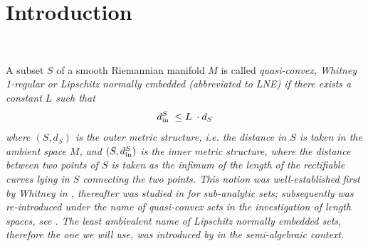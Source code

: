 \documentclass[11pt]{amsart}
\newcommand{\inn}{{{\rm in}}}
\numberwithin{equation}{section}
\numberwithin{equation}{section}
\begin{document}
\maketitle
\setcounter{tocdepth}{1}
\tableofcontents



\section{Introduction}
%
%
$ $

A subset $S$ of a smooth Riemannian manifold $M$ is called \em quasi-convex, Whitney 1-regular 
\em or \em Lipschitz normally embedded \em (abbreviated to LNE) if there exists a constant $L$ such that
\begin{equation}\label{eq:prop-LNE}
d_\inn^S \; \leq L \; \cdot d_S
\end{equation}
where $(S,d_S)$ is the outer metric structure, i.e. the distance in $S$
is taken in the ambient space $M$, and $(S,d_\inn^S)$ is the inner metric structure, where the
distance between two points of $S$ is taken as the infimum of the length of the 
rectifiable curves lying in $S$ connecting the two points. This notion was well-established first by Whitney in \cite{Whi1,Whi2}, thereafter was studied in \cite{Sta,Kur1} for sub-analytic sets; subsequently was re-introduced under the name of quasi-convex sets in the investigation of length spaces, see \cite{Gro1}. The least ambivalent name of Lipschitz normally embedded sets, therefore the one we will use, was introduced by \cite{BiMo} in the semi-algebraic context.
\end{document}
